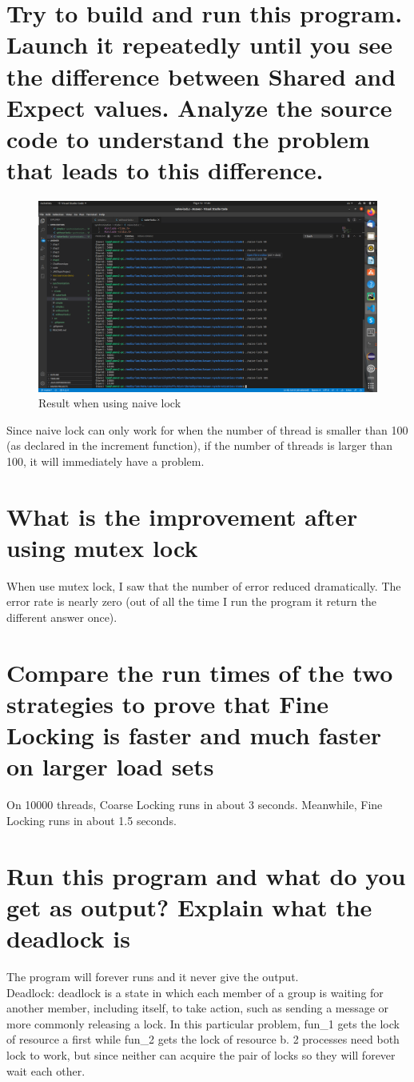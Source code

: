 \documentclass[11pt,a4paper]{article}
\begin{document}
\section{Try to build and run this program. Launch it repeatedly until you see the difference between Shared and Expect values. Analyze the source code to understand the problem that leads to this difference.}
\begin{figure}[h!]
	\centering
  	\includegraphics[width=\linewidth]{naive-lock.png}
  	\caption{Result when using naive lock}
  	\label{fig:naivelock}
\end{figure}
Since naive lock can only work for when the number of thread is smaller than 100 (as declared in the increment function), if the number of threads is larger than 100, it will immediately have a problem.

\section{What is the improvement after using mutex lock}
When use mutex lock, I saw that the number of error reduced dramatically. The error rate is nearly zero (out of all the time I run the program it return the different answer once). 

\section{Compare the run times of the two strategies to prove that Fine Locking is faster and much faster on larger load sets}
On 10000 threads, Coarse Locking runs in about 3 seconds. Meanwhile, Fine Locking runs in about 1.5 seconds.

\section{Run this program and what do you get as output? Explain what the deadlock is}
The program will forever runs and it never give the output.\\
Deadlock: deadlock is a state in which each member of a group is waiting for another member, including itself, to take action, such as sending a message or more commonly releasing a lock. In this particular problem, fun\_1 gets the lock of resource a first while fun\_2 gets the lock of resource b. 2 processes need both lock to work, but since neither can acquire the pair of locks so they will forever wait each other.
\end{document}

